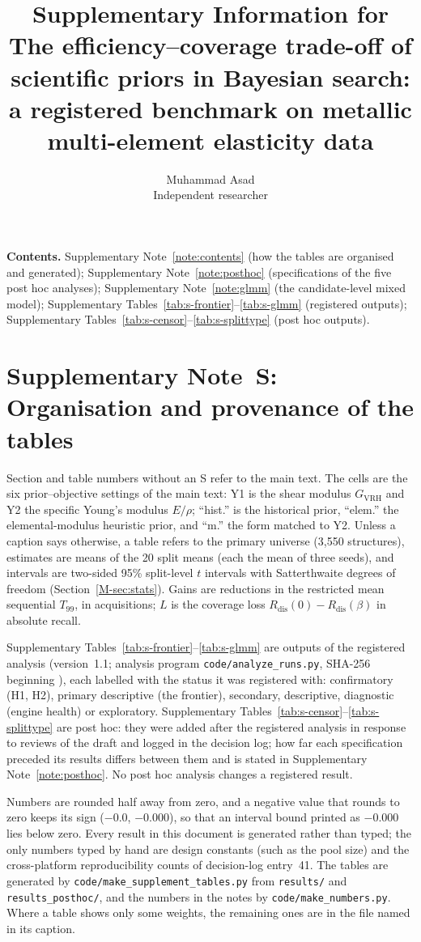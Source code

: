 \documentclass[11pt,a4paper]{article}
\title{Supplementary Information for\\[4pt]
\large The efficiency--coverage trade-off of scientific priors in Bayesian search:\\
a registered benchmark on metallic multi-element elasticity data}
\author{Muhammad Asad\\\small Independent researcher}
\newcommand{\Rdis}{R_{\mathrm{dis}}}
\newcommand{\Tnn}{T_{99}}
\newcounter{snote}
\renewcommand{\thesnote}{S\arabic{snote}}
\newcommand{\snote}[2]{\refstepcounter{snote}\label{#1}\section*{Supplementary Note~\thesnote: #2}}
\begin{document}
\sloppy
\maketitle

\noindent\textbf{Contents.} Supplementary Note~\ref{note:contents} (how the tables are organised and generated);
Supplementary Note~\ref{note:posthoc} (specifications of the five post hoc analyses);
Supplementary Note~\ref{note:glmm} (the candidate-level mixed model);
Supplementary Tables~\ref{tab:s-frontier}--\ref{tab:s-glmm} (registered outputs);
Supplementary Tables~\ref{tab:s-censor}--\ref{tab:s-splittype} (post hoc outputs).

\snote{note:contents}{Organisation and provenance of the tables}

Section and table numbers without an S refer to the main text. The cells are the six prior--objective settings of the main text:
Y1 is the shear modulus $G_{\mathrm{VRH}}$ and Y2 the specific Young's modulus $E/\rho$; ``hist.'' is the historical prior,
``elem.'' the elemental-modulus heuristic prior, and ``m.'' the form matched to Y2. Unless a caption says otherwise, a table refers
to the primary universe (3,550 structures), estimates are means of the 20 split means (each the mean of three seeds), and
intervals are two-sided 95\% split-level $t$ intervals with Satterthwaite degrees of freedom (Section~\ref{M-sec:stats}).
Gains are reductions in the restricted mean sequential $\Tnn$, in acquisitions; $L$ is the coverage loss
$\Rdis(0)-\Rdis(\beta)$ in absolute recall.

Supplementary Tables~\ref{tab:s-frontier}--\ref{tab:s-glmm} are outputs of the registered analysis (version~1.1; analysis
program \texttt{code/analyze\_runs.py}, SHA-256 beginning \texttt{}), each labelled with the status it
was registered with: confirmatory (H1, H2), primary descriptive (the frontier), secondary, descriptive, diagnostic (engine
health) or exploratory. Supplementary
Tables~\ref{tab:s-censor}--\ref{tab:s-splittype} are post hoc: they were added after the registered analysis in response to
reviews of the draft and logged in the decision log; how far each specification preceded its results differs between them and is
stated in Supplementary Note~\ref{note:posthoc}.
No post hoc analysis changes a registered result.

Numbers are rounded half away from zero, and a negative value that rounds to zero keeps its sign ($-$0.0, $-$0.000), so that
an interval bound printed as $-$0.000 lies below zero. Every result in this document is generated rather than typed; the only numbers typed by hand are design constants (such as
the pool size) and the cross-platform reproducibility counts of decision-log entry~41. The tables are generated by \texttt{code/make\_supplement\_tables.py} from
\texttt{results/} and \texttt{results\_posthoc/}, and the numbers in the notes by \texttt{code/make\_numbers.py}. Where a table
shows only some weights, the remaining ones are in the file named in its caption.
\end{document}
